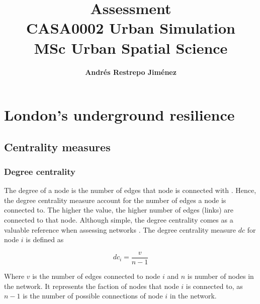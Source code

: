 \documentclass{article}
\title{\textbf{Assessment\\CASA0002 Urban Simulation\\MSc Urban Spatial Science}}
\author{\textbf{Andrés Restrepo Jiménez}}
\begin{document}
\maketitle


\section{London’s underground resilience}



\subsection{Centrality measures}

\subsubsection{Degree centrality} 

The degree of a node is the number of edges that node is connected with \citep{arcaute_networks_2023}. Hence, the degree centrality measure account for the number of edges a node is connected to. The higher the value, the higher number of edges (links) are connected to that node. Although simple, the degree centrality comes as a valuable reference when assessing networks \citep{newman_networks_2018}. The degree centrality measure $dc$ for node $i$ is defined as 

\[dc_i = \frac{v}{n-1}\]

Where $v$ is the number of edges connected to node $i$ and $n$ is number of nodes in the network. It represents the faction of nodes that node $i$ is connected to, as $n-1$ is the number of possible connections of node $i$ in the network.
\end{document}
